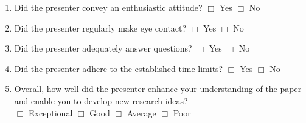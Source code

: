 \documentclass[letterpaper, 10pt]{article} %
\begin{document}
{\begin{enumerate}
\item Did the presenter convey an enthusiastic attitude? \hspace*{.05in}
  $\Box$ Yes \hspace*{.05in} $\Box$ No

\item Did the presenter regularly make eye contact? \hspace*{.05in}
  $\Box$ Yes \hspace*{.05in} $\Box$ No

\item Did the presenter adequately answer questions? \hspace*{.05in}
  $\Box$ Yes \hspace*{.05in} $\Box$ No

\item Did the presenter adhere to the established time limits? \hspace*{.05in}
  $\Box$ Yes \hspace*{.05in} $\Box$ No

\item Overall, how well did the presenter enhance your understanding
  of the paper and enable you to develop new research ideas?
  \\ \hspace*{.05in} $\Box$ Exceptional \hspace*{.05in} $\Box$
  Good \hspace*{.05in} $\Box$ Average \hspace*{.05in} $\Box$ Poor

\end{enumerate}

}
\end{document}
